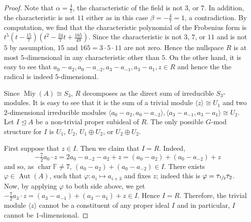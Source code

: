 \documentclass[10pt,a4paper]{amsart}
\DeclareMathOperator{\Aut}{Aut}
\newcommand\FF{\mathbb{F}}
\DeclareMathOperator{\Miy}{Miy}
\newcommand\al{\alpha}
\newcommand\bt{\beta}
\DeclareMathOperator{\ch}{char}
\newcommand{\half}{{\tau_{\sfrac{1}{2}}}} %
\newcommand\la{\langle}
\renewcommand{\phi}{\varphi}
\newcommand\ra{\rangle}
\begin{document}
\begin{proof}
Note that $\al = \frac{4}{7}$, the characteristic of the field is not $3$, or $7$.  In addition, the characteristic is not $11$ either as in this case $\bt = -\frac{4}{7} = 1$, a contradiction.  By computation, we find that the characteristic polynomial of the Frobenius form is $t^5(t - \frac{15}{7})(t^2 - \frac{34}{7}t + \frac{165}{49})$.  Since the characteristic is not $3$, $7$, or $11$ and is not $5$ by assumption, $15$ and $165 = 3\cdot 5 \cdot 11$ are not zero.  Hence the nullspace $R$ is at most $5$-dimensional in any characteristic other than $5$.  On the other hand, it is easy to see that $a_0 - a_2, a_0 - a_{-2}, a_3 - a_{-1}, a_3 - a_1, z \in R$ and hence the the radical is indeed $5$-dimensional.

Since $\Miy(A) \cong S_3$, $R$ decomposes as the direct sum of irreducible $S_3$-modules.  It is easy to see that it is the sum of a trivial module $\la z \ra \cong U_1$ and two $2$-dimensional irreducible modules $\langle a_0 - a_2, a_0 - a_{-2} \rangle, \langle a_3 - a_{-1}, a_3 - a_1 \rangle \cong U_2$.  Let $I \trianglelefteq A$ be a non-trivial proper subideal of $R$. The only possible $G$-mod structure for $I$ is $U_1$, $U_2$, $U_1 \oplus U_2$, or $U_2 \oplus U_2$.

First suppose that $z \in I$.  Then we claim that $I = R$.  Indeed,
\begin{equation}\label{6A 4/7 eqn z}
-\tfrac{7}{2} a_0 \cdot z = 2a_0 - a_{-2} - a_2 + z = (a_0 - a_2) + (a_0 -a_{-2}) + z
\end{equation}
and so, as $\ch \FF \neq 7$, $(a_0 - a_2) + (a_0 -a_{-2}) \in I$.  There exists $\phi \in \Aut(A)$, such that $\phi \colon a_i \mapsto a_{i+3}$ and fixes $z$; indeed this is $\phi = \half \tau_2$.  Now, by applying $\phi$ to both side above, we get $-\tfrac{7}{2} a_3 \cdot z = (a_3 -a_{-1}) + (a_3 - a_1) +z \in I$. Hence $I = R$.  Therefore, the trivial module $\la z \ra$ cannot be a constituent of any proper ideal $I$ and in particular, $I$ cannot be $1$-dimensional.


\end{proof}
\end{document}
